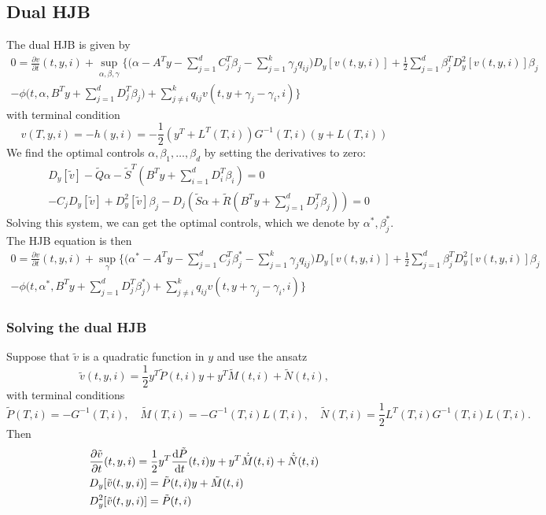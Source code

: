 \subsection{Dual HJB}
The dual HJB is given by
\begin{align*}
    0 = \frac{\partial v}{\partial t}(t, y, i) + \sup_{\alpha, \beta, \gamma} \bigg\{ 
    \bigg(\alpha - A^T y - \sum_{j=1}^d C_j^T \beta_j - \sum_{j=1}^k \gamma_j q_{ij}\bigg) D_y[v(t,y,i)] + \frac12 \sum_{j=1}^d \beta_j^T D_y^2[v(t,y,i)]\beta_j \\
    - \phi \big(t, \alpha, B^T y + \sum_{j=1}^d D_j^T \beta_j  \big) + \sum_{j \ne i}^k q_{ij} v(t, y+\gamma_j - \gamma_i, i)\bigg\}
\end{align*}
with terminal condition
\begin{equation*}
    v(T, y,i) = - h(y,i) = - \frac12 (y^T + L^T(T,i))G^{-1}(T,i)(y + L(T,i))
\end{equation*}
We find the optimal controls $\alpha, \beta_1, \dots, \beta_d$ by setting the derivatives to zero:
\begin{align}
    &D_y[\tilde{v}] - \tilde{Q}\alpha - \tilde{S}^T (B^T y + \sum_{i=1}^d D_i^T \beta_i) = 0 \\
    & - C_j D_y[\tilde{v}] + D_y^2[\tilde{v}] \beta_j
    - D_j (\tilde{S}\alpha + \tilde{R}(B^T y + \sum_{j=1}^d D_j^T \beta_j)) = 0
\end{align}
Solving this system, we can get the optimal controls, which we denote by $\alpha^\ast, \beta_j^\ast$. The HJB equation is then
\begin{align*}
    0 = \frac{\partial v}{\partial t}(t, y, i) + \sup_{\gamma} \bigg\{ 
    \bigg(\alpha^\ast - A^T y - \sum_{j=1}^d C_j^T \beta_j^\ast - \sum_{j=1}^k \gamma_j q_{ij}\bigg) D_y[v(t,y,i)] + \frac12 \sum_{j=1}^d \beta_j^T D_y^2[v(t,y,i)]\beta_j \\
    - \phi \big(t, \alpha^\ast, B^T y + \sum_{j=1}^d D_j^T \beta_j^\ast  \big) + \sum_{j \ne i}^k q_{ij} v(t, y+\gamma_j - \gamma_i, i)\bigg\}
\end{align*}
\subsubsection{Solving the dual HJB}
Suppose that $\tilde{v}$ is a quadratic function in $y$ and use the ansatz
\begin{equation}
    \tilde{v}(t,y, i) = \frac12 y^T \tilde{P}(t,i) y + y^T \tilde{M}(t,i) + \tilde{N}(t,i),
\end{equation}
with terminal conditions
\begin{equation}
    \tilde{P}(T,i) = -G^{-1}(T,i), \quad \tilde{M}(T,i) = - G^{-1}(T,i)L(T,i), \quad \tilde{N}(T,i) = \frac12 L^T(T,i)G^{-1}(T,i)L(T,i). 
\end{equation}
Then
\begin{align*}
    &\frac{\partial \tilde{v}}{\partial t}(t, y,i) = \frac12 y^T \frac{\mathrm{d} \tilde{P}}{\mathrm{d} t}(t,i) y + y^T \dot{\tilde{M}}(t,i) + \dot{\tilde{N}}(t,i)\\
    &D_y[\tilde{v}(t,y,i)] = \tilde{P}(t,i) y + \tilde{M}(t,i)\\
    &D_y^2[\tilde{v}(t,y,i)] = \tilde{P}(t,i)
\end{align*}

